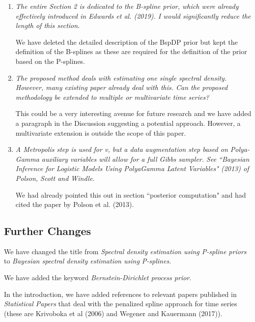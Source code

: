 \documentclass{scrartcl}
\newcommand{\refereeQuote}{\textit }
\newcommand{\response}{}
\begin{document}
\begin{enumerate}
\item
\refereeQuote{The entire Section 2 is dedicated to the B-spline prior, which were already effectively introduced in Edwards et al. (2019). I would significantly reduce the length of this section.}\smallskip

\response{We have deleted the detailed description of the BspDP prior but kept the definition of the B-splines as these are required for the definition of the prior based on the  P-splines.}\bigskip

\item 
\refereeQuote{The proposed method deals with estimating one single spectral density. However, many existing paper already deal with this. Can the proposed methodology be extended to multiple or multivariate time series?}\smallskip

\response{
 This could be a
very interesting avenue for future research and we have added a paragraph in the Discussion suggesting a potential approach. However, a multivariate extension is outside the scope of this paper.}\bigskip

\item
\refereeQuote{A Metropolis step is used for v, but a data augmentation step based on Polya-Gamma auxiliary variables will allow for a full Gibbs sampler. See ``Bayesian Inference for Logistic Models Using PolyaGamma Latent Variables" (2013) of Polson, Scott and Windle.}\smallskip

\response{We had already pointed this out in section ``posterior computation" and had cited the paper by Polson et al. (2013).}

\end{enumerate}


\subsection*{Further Changes}

We have changed the title from {\em Spectral density estimation using P-spline priors} to {\em Bayesian spectral density estimation using P-splines}.\smallskip

We have added the keyword {\em Bernstein-Dirichlet process prior}.\smallskip

In the introduction, we have added references to relevant papers published in {\em Statistical Papers} that deal with the penalized spline approach for time series (these are Krivoboka et al (2006) and Wegener and Kauermann (2017)).
\end{document}
